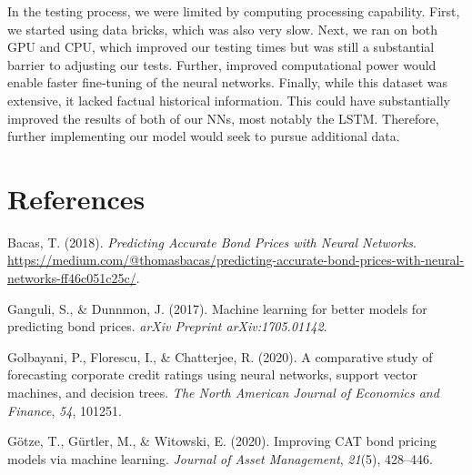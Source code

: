 \documentclass[
  man]{apa6}
\newlength{\cslhangindent}
\newlength{\cslentryspacingunit} %
\newenvironment{CSLReferences}[2] %
 {%
  \setlength{\parindent}{0pt}
  \ifodd #1
  \let\oldpar\par
  \def\par{\hangindent=\cslhangindent\oldpar}
  \fi
  \setlength{\parskip}{#2\cslentryspacingunit}
 }%
 {}
\begin{document}
In the testing process, we were limited by computing processing capability. First, we started using data bricks, which was also very slow. Next, we ran on both GPU and CPU, which improved our testing times but was still a substantial barrier to adjusting our tests. Further, improved computational power would enable faster fine-tuning of the neural networks. Finally, while this dataset was extensive, it lacked factual historical information. This could have substantially improved the results of both of our NNs, most notably the LSTM. Therefore, further implementing our model would seek to pursue additional data.
\newpage

\hypertarget{references}{%
\section{References}\label{references}}

\hypertarget{refs}{}
\begin{CSLReferences}{1}{0}
\leavevmode{}%
Bacas, T. (2018). \emph{{Predicting Accurate Bond Prices with Neural Networks}}. \url{https://medium.com/@thomasbacas/predicting-accurate-bond-prices-with-neural-networks-ff46c051c25c/}.

\leavevmode{}%
Ganguli, S., \& Dunnmon, J. (2017). Machine learning for better models for predicting bond prices. \emph{arXiv Preprint arXiv:1705.01142}.

\leavevmode{}%
Golbayani, P., Florescu, I., \& Chatterjee, R. (2020). A comparative study of forecasting corporate credit ratings using neural networks, support vector machines, and decision trees. \emph{The North American Journal of Economics and Finance}, \emph{54}, 101251.

\leavevmode{}%
Götze, T., Gürtler, M., \& Witowski, E. (2020). Improving CAT bond pricing models via machine learning. \emph{Journal of Asset Management}, \emph{21}(5), 428--446.

\end{CSLReferences}
\end{document}
